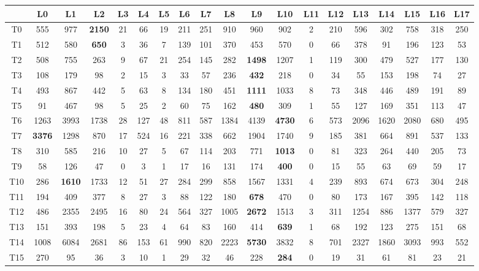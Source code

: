 \documentclass[german,version-2020-11]{uzl-thesis}
\begin{document}
\begin{itemize}
\begin{enumerate}
\begin{figure}[H]
\begin{center}
\tiny
\renewcommand{\arraystretch}{2}
\begin{tabular}{ccccccccccccccccccc}
\hline
\hline 
&L0&L1&L2&L3&L4&L5&L6&L7&L8&L9&L10&L11&L12&L13&L14&L15&L16&L17\\
\hline
\hline
T0&555& 977& \textbf{2150}& 21& 66& 19& 211& 251& 910& 960& 902& 2& 210& 596& 302& 758& 318& 250\\
\hline 
T1&512& 580& \textbf{650}& 3& 36& 7& 139& 101& 370& 453& 570& 0& 66& 378& 91& 196& 123& 53\\
\hline 
T2&508& 755& 263& 9& 67& 21& 254& 145& 282& \textbf{1498}& 1207& 1& 119& 300& 479& 527& 177& 130\\
\hline 
T3&108& 179& 98& 2& 15& 3& 33& 57& 236& \textbf{432}& 218& 0& 34& 55& 153& 198& 74& 27\\
\hline 
T4&493& 867& 442& 5& 63& 8& 134& 180& 451& \textbf{1111}& 1033& 8& 73& 348& 446& 489& 191& 89\\
\hline 
T5&91& 467& 98& 5& 25& 2& 60& 75& 162& \textbf{480}& 309& 1& 55& 127& 169& 351& 113& 47\\
\hline 
T6&1263& 3993& 1738& 28& 127& 48& 811& 587& 1384& 4139& \textbf{4730}& 6& 573& 2096& 1620& 2080& 680& 495\\
\hline 
T7&\textbf{3376}& 1298& 870& 17& 524& 16& 221& 338& 662& 1904& 1740& 9& 185& 381& 664& 891& 537& 133\\
\hline 
T8&310& 585& 216& 10& 27& 5& 67& 114& 203& 771 & \textbf{1013}& 0& 81& 323& 264& 440& 205& 73\\
\hline 
T9&58& 126& 47& 0& 3& 1& 17& 16& 131& 174& \textbf{400}& 0& 15& 55& 63& 69& 59& 17\\
\hline 
T10&286& \textbf{1610}& 1733& 12& 51& 27& 284& 299& 858& 1567& 1331& 4& 239& 893& 674& 673& 304& 248\\
\hline 
T11&194& 409& 377& 8& 27& 3& 88& 122& 180& \textbf{678}& 470& 0& 80& 173& 167& 395& 142& 118\\
\hline 
T12&486& 2355& 2495& 16& 80& 24& 564& 327& 1005& \textbf{2672}& 1513& 3& 311& 1254& 886& 1377& 579& 327\\
\hline 
T13&151& 393& 198& 5& 23& 4& 64& 83& 160& 414& \textbf{639}& 1& 68& 192& 123& 275& 151& 68\\
\hline 
T14&1008& 6084& 2681& 86& 153& 61& 990& 820& 2223& \textbf{5730}& 3832& 8& 701& 2327& 1860& 3093& 993& 552\\
\hline 
T15&270& 95& 36& 3& 10& 1& 29& 32& 46& 228& \textbf{284}& 0& 19& 31& 61& 81& 23& 21\\

\end{tabular}
\end{center}
\end{figure}
\end{enumerate}
\end{itemize}
\end{document}
